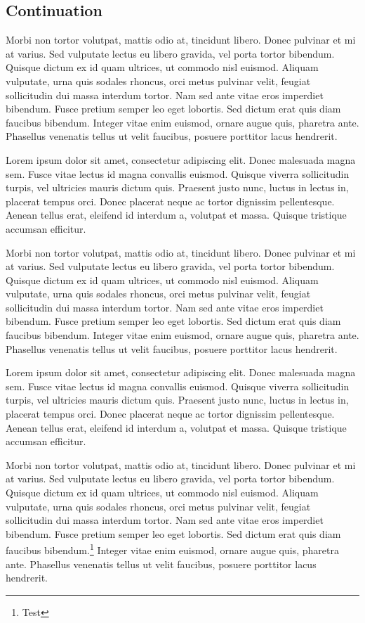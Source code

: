 \documentclass[b5paper,twoside,openright]{scrbook}
\let\cite=\autocite
\begin{document}
\subsection{Continuation}
Morbi non tortor volutpat, mattis odio at, tincidunt libero.
Donec pulvinar et mi at varius.
Sed vulputate lectus eu libero gravida, vel porta tortor bibendum.
Quisque dictum ex id quam ultrices, ut commodo nisl euismod.
Aliquam vulputate, urna quis sodales rhoncus, orci metus pulvinar velit, feugiat sollicitudin dui massa interdum tortor.
Nam sed ante vitae eros imperdiet bibendum.
Fusce pretium semper leo eget lobortis.
Sed dictum erat quis diam faucibus bibendum.
Integer vitae enim euismod, ornare augue quis, pharetra ante.
Phasellus venenatis tellus ut velit faucibus, posuere porttitor lacus hendrerit.

Lorem ipsum dolor sit amet, consectetur adipiscing elit.\cite{Test1}\cite{Test2}
Donec malesuada magna sem.
Fusce vitae lectus id magna convallis euismod.
Quisque viverra sollicitudin turpis, vel ultricies mauris dictum quis.
Praesent justo nunc, luctus in lectus in, placerat tempus orci.
Donec placerat neque ac tortor dignissim pellentesque.
Aenean tellus erat, eleifend id interdum a, volutpat et massa.
Quisque tristique accumsan efficitur.

Morbi non tortor volutpat, mattis odio at, tincidunt libero.
Donec pulvinar et mi at varius.
Sed vulputate lectus eu libero gravida, vel porta tortor bibendum.
Quisque dictum ex id quam ultrices, ut commodo nisl euismod.
Aliquam vulputate, urna quis sodales rhoncus, orci metus pulvinar velit, feugiat sollicitudin dui massa interdum tortor.
Nam sed ante vitae eros imperdiet bibendum.
Fusce pretium semper leo eget lobortis.
Sed dictum erat quis diam faucibus bibendum.
Integer vitae enim euismod, ornare augue quis, pharetra ante.
Phasellus venenatis tellus ut velit faucibus, posuere porttitor lacus hendrerit.

Lorem ipsum dolor sit amet, consectetur adipiscing elit.
Donec malesuada magna sem.
Fusce vitae lectus id magna convallis euismod.
Quisque viverra sollicitudin turpis, vel ultricies mauris dictum quis.
Praesent justo nunc, luctus in lectus in, placerat tempus orci.
Donec placerat neque ac tortor dignissim pellentesque.
Aenean tellus erat, eleifend id interdum a, volutpat et massa.
Quisque tristique accumsan efficitur.

Morbi non tortor volutpat, mattis odio at, tincidunt libero.
Donec pulvinar et mi at varius.
Sed vulputate lectus eu libero gravida, vel porta tortor bibendum.
Quisque dictum ex id quam ultrices, ut commodo nisl euismod.
Aliquam vulputate, urna quis sodales rhoncus, orci metus pulvinar velit, feugiat sollicitudin dui massa interdum tortor.
Nam sed ante vitae eros imperdiet bibendum.
Fusce pretium semper leo eget lobortis.
Sed dictum erat quis diam faucibus bibendum.\footnote{Test}
Integer vitae enim euismod, ornare augue quis, pharetra ante.
Phasellus venenatis tellus ut velit faucibus, posuere porttitor lacus hendrerit.
\end{document}
